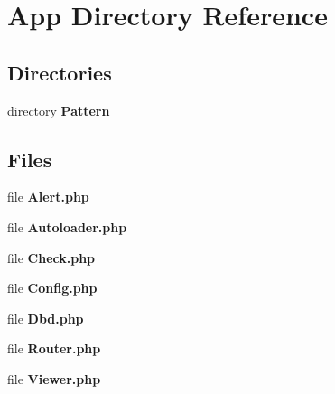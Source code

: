 \section{App Directory Reference}
\label{dir_b1617d756d2224e91d37255e84e89ba2}
\subsection*{Directories}
\begin{DoxyCompactItemize}
\item 
directory \textbf{ Pattern}
\end{DoxyCompactItemize}
\subsection*{Files}
\begin{DoxyCompactItemize}
\item 
file \textbf{ Alert.\+php}
\item 
file \textbf{ Autoloader.\+php}
\item 
file \textbf{ Check.\+php}
\item 
file \textbf{ Config.\+php}
\item 
file \textbf{ Dbd.\+php}
\item 
file \textbf{ Router.\+php}
\item 
file \textbf{ Viewer.\+php}
\end{DoxyCompactItemize}
